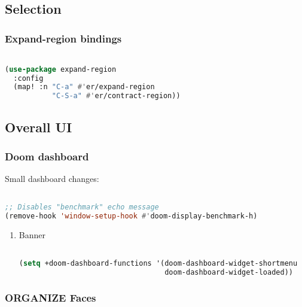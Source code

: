 \documentclass[11pt]{article}
\begin{document}
\subsection{Selection}
\label{sec:selection}


\subsubsection{Expand-region\hfill{} bindings}
\label{sec:expand-region}
\begin{lstlisting}[language=Lisp]%! Someone please complete this list for me

(use-package expand-region
  :config
  (map! :n "C-a" #'er/expand-region
           "C-S-a" #'er/contract-region))
\end{lstlisting}


\subsection{Overall UI}
\label{sec:overall-ui}


\subsubsection{Doom dashboard}
\label{sec:doom-dashboard}
Small dashboard changes:

\begin{lstlisting}[language=Lisp]%! Someone please complete this list for me

;; Disables "benchmark" echo message
(remove-hook 'window-setup-hook #'doom-display-benchmark-h)
\end{lstlisting}

\begin{enumerate}
  \item Banner
  \label{sec:banner}

  \begin{lstlisting}[language=Lisp]%! Someone please complete this list for me

(setq +doom-dashboard-functions '(doom-dashboard-widget-shortmenu
                                  doom-dashboard-widget-loaded))
\end{lstlisting}
\end{enumerate}

\subsubsection{ORGANIZE Faces}
\label{sec:organize-faces}
\end{document}
